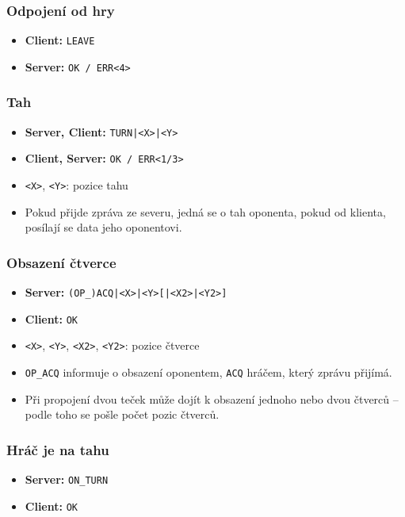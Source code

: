 \documentclass[11pt,a4paper]{article}
\begin{document}
\subsubsection*{Odpojení od hry}
\begin{itemize}
	\item \textbf{Client:} \texttt{LEAVE}
	\item \textbf{Server:} \texttt{OK / ERR<4>}
\end{itemize}

\subsubsection*{Tah}
\begin{itemize}
	\item \textbf{Server, Client:} \texttt{TURN|<X>|<Y>}
	\item \textbf{Client, Server:} \texttt{OK / ERR<1/3>}
	\item \texttt{<X>}, \texttt{<Y>}: pozice tahu
	\item Pokud přijde zpráva ze severu, jedná se o tah oponenta, pokud od klienta, posílají se data jeho oponentovi.
\end{itemize}

\subsubsection*{Obsazení čtverce}
\begin{itemize}
	\item \textbf{Server:} \texttt{(OP\_)ACQ|<X>|<Y>[|<X2>|<Y2>]}
	\item \textbf{Client:} \texttt{OK}
	\item \texttt{<X>}, \texttt{<Y>}, \texttt{<X2>}, \texttt{<Y2>}: pozice čtverce
	\item \texttt{OP\_ACQ} informuje o obsazení oponentem, \texttt{ACQ} hráčem, který zprávu přijímá.
	\item Při propojení dvou teček může dojít k obsazení jednoho nebo dvou čtverců -- podle toho se pošle počet pozic čtverců.
\end{itemize}

\subsubsection*{Hráč je na tahu}
\begin{itemize}
	\item \textbf{Server:} \texttt{ON\_TURN}
	\item \textbf{Client:} \texttt{OK}
\end{itemize}
\end{document}
